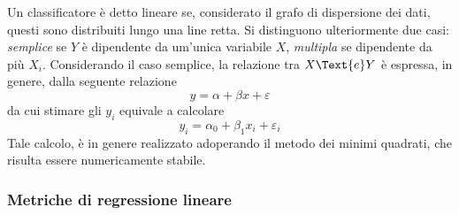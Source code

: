 \documentclass{subfiles}
\begin{document}
Un classificatore è detto lineare se, considerato il grafo di dispersione dei dati, questi sono distribuiti lungo una line retta.
Si distinguono ulteriormente due casi: \emph{semplice} se \(Y\) è dipendente da um'unica variabile \(X\), \emph{multipla} se dipendente da più \(X_{i}\).
Considerando il caso semplice, la relazione tra \(X \Text{e} Y\) è espressa, in genere, dalla seguente relazione
\[
    y = \alpha + \beta x + \varepsilon
\]
da cui stimare gli \(y_{i}\) equivale a calcolare
\[
    y_{i} = \alpha_{0} + \beta_{1} x_{i} + \varepsilon_{i}
\]
Tale calcolo, è in genere realizzato adoperando il metodo dei minimi quadrati, che risulta essere numericamente stabile.

\subsubsection{Metriche di regressione lineare}

\end{document}
